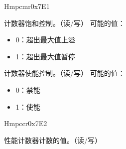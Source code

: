 \begin{register}{H}{mpcmr}{0x7E1}\label{regdesc:MPCMR}
%
%
%
\regnewline%
\begin{regdesc}\begin{reglist}
\label{fielddesc:COUNTER_SATURATION}\item [COUNT\_SAT] 计数器饱和控制。（读/写）
\newline 可能的值：
\begin{itemize}
    \setlength\itemsep{-1em}
    \item 0：超出最大值上溢
    \item 1：超出最大值暂停
\end{itemize}
\label{fielddesc:COUNTER_ENABLE}\item [COUNT\_EN] 计数器使能控制。（读/写）
\newline 可能的值：
\begin{itemize}
    \setlength\itemsep{-1em}
    \item 0：禁能
    \item 1：使能
\end{itemize}
\end{reglist}\end{regdesc}
\end{register}

\begin{register}{H}{mpccr}{0x7E2}\label{regdesc:MPCCR}
%
\regnewline%
\begin{regdesc}\begin{reglist}
\label{fielddesc:MPCCR}\item [MPCCR] 性能计数器计数的值。（读/写）
\end{reglist}\end{regdesc}
\end{register}


